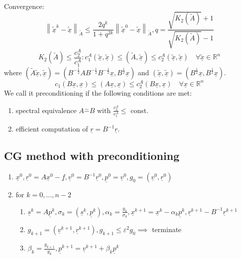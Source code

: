 \documentclass{article}
\newcommand{\norm}[1]{\left\|#1\right\|}
\begin{document}
Convergence:
\[ \norm{\underline{\tilde x}^k - \underline{\tilde x}}_{\tilde A} \leq \frac{2q^k}{1 + q^{2k}} \norm{\underline{\tilde x}^0 - \underline{\tilde x}}_{\tilde A}, q = \frac{\sqrt{K_2(\tilde A)} + 1}{\sqrt{K_2(\tilde A)} - 1} \]
\[ K_2(\tilde A) \leq \frac{c_2^A}{c_1^A}: c_1^A(\underline{\tilde x}, \underline{\tilde x}) \leq (\tilde A, \underline{\tilde x}) \leq c_2^A (\underline{\tilde x}, \underline{\tilde x}) \quad \forall \underline{\tilde x} \in \mathbb R^n \]
where $(\tilde A \underline{\tilde x}, \underline{\tilde x}) = (B^{-\frac12} AB^{-\frac12} B^{-\frac12} \underline x, B^{\frac12} \underline x)$ and $(\underline{\tilde x}, \underline{\tilde x}) = (B^{\frac12}\underline x, B^{\frac12} \underline x)$.
\[ c_1(B \underline x, \underline x) \leq (A \underline x, \underline x) \leq c_2^A (B\underline x, \underline x) \quad \forall \underline x \in \mathbb R^n \]
We call it preconditioning if the following conditions are met:
\begin{enumerate}
   \item spectral equivalence $A \stackrel\sim- B$ with $\frac{c_2^A}{c_1^A} \leq$ const.
   \item efficient computation of $\underline r = B^{-1} \underline r$.
 \end{enumerate}

\subsection{CG method with preconditioning}

\begin{enumerate}
  \item $\underline x^0, \underline r^0 = A \underline x^0 - \underline f, \underline v^0 = B^{-1} \underline r^0, \underline p^0 = \underline v^0, g_0 = (\underline v^0, \underline r^0)$
  \item for $k=0,\ldots,n-2$
  \begin{enumerate}
    \item $\underline s^k = A \underline p^k, \sigma_k = (\underline s^k, \underline p^k), \alpha_k = \frac{g_k}{\sigma_k}, \underline x^{k+1} = \underline x^k - \alpha_k \underline p^k, \underline r^{k+1} - B^{-1} \underline r^{k+1}$
    \item $g_{k+1} = (\underline v^{k+1}, \underline r^{k+1}), g_{k+1} \leq \varepsilon^2 g_0 \implies$ terminate
    \item $\beta_k = \frac{g_{k+1}}{g_k}, \underline p^{k+1} = \underline v^{k+1} + \beta_k \underline p^k$
  \end{enumerate}
\end{enumerate}
\end{document}
